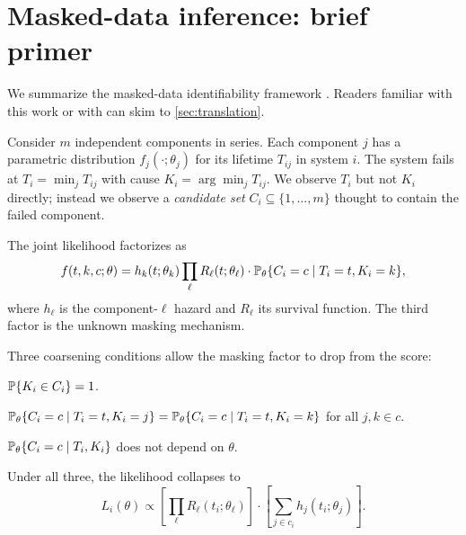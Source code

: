 \section{Masked-data inference: brief primer}
\label{sec:background}

We summarize the masked-data identifiability framework
\citep{towell2026masked,heitjan1991ignorability}. Readers familiar
with this work or with \citet{towell2026scrnacoarsening,
towell2026spatialcoarsening} can skim to \cref{sec:translation}.

Consider $m$ independent components in series. Each component $j$ has a
parametric distribution $f_j(\cdot;\theta_j)$ for its lifetime $T_{ij}$
in system $i$. The system fails at $T_i = \min_j T_{ij}$ with cause
$K_i = \arg\min_j T_{ij}$. We observe $T_i$ but not $K_i$ directly;
instead we observe a \emph{candidate set} $C_i \subseteq \{1,\ldots,m\}$
thought to contain the failed component.

The joint likelihood factorizes as
\begin{equation}
  f(t, k, c; \theta)
  = h_k(t; \theta_k) \prod_{\ell} R_\ell(t; \theta_\ell)
    \cdot \mathbb{P}_\theta\{C_i = c \mid T_i = t, K_i = k\},
  \label{eq:bg-joint}
\end{equation}
where $h_\ell$ is the component-$\ell$ hazard and $R_\ell$ its survival
function. The third factor is the unknown masking mechanism.

Three coarsening conditions allow the masking factor to drop from the
score:

\begin{condition}[Support, C1]
\label{cond:c1}
$\mathbb{P}\{K_i \in C_i\} = 1$.
\end{condition}

\begin{condition}[Symmetry, C2]
\label{cond:c2}
$\mathbb{P}_\theta\{C_i=c \mid T_i=t, K_i=j\} = \mathbb{P}_\theta\{C_i=c \mid
T_i=t, K_i=k\}$ for all $j,k \in c$.
\end{condition}

\begin{condition}
\label{cond:c3}
$\mathbb{P}_\theta\{C_i=c \mid T_i, K_i\}$ does not depend on $\theta$.
\end{condition}

Under all three, the likelihood collapses to
\begin{equation}
  L_i(\theta) \propto \left[\prod_\ell R_\ell(t_i;\theta_\ell)\right]
  \cdot \left[\sum_{j \in c_i} h_j(t_i; \theta_j)\right].
  \label{eq:bg-c1c2c3}
\end{equation}

